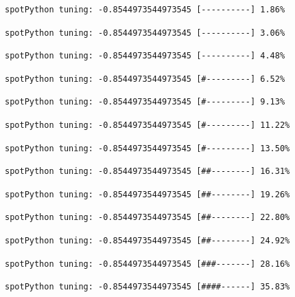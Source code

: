 \documentclass[
  letterpaper,
  DIV=11,
  numbers=noendperiod]{scrreprt}
\begin{document}
\begin{verbatim}
spotPython tuning: -0.8544973544973545 [----------] 1.86% 
\end{verbatim}

\begin{verbatim}
spotPython tuning: -0.8544973544973545 [----------] 3.06% 
\end{verbatim}

\begin{verbatim}
spotPython tuning: -0.8544973544973545 [----------] 4.48% 
\end{verbatim}

\begin{verbatim}
spotPython tuning: -0.8544973544973545 [#---------] 6.52% 
\end{verbatim}

\begin{verbatim}
spotPython tuning: -0.8544973544973545 [#---------] 9.13% 
\end{verbatim}

\begin{verbatim}
spotPython tuning: -0.8544973544973545 [#---------] 11.22% 
\end{verbatim}

\begin{verbatim}
spotPython tuning: -0.8544973544973545 [#---------] 13.50% 
\end{verbatim}

\begin{verbatim}
spotPython tuning: -0.8544973544973545 [##--------] 16.31% 
\end{verbatim}

\begin{verbatim}
spotPython tuning: -0.8544973544973545 [##--------] 19.26% 
\end{verbatim}

\begin{verbatim}
spotPython tuning: -0.8544973544973545 [##--------] 22.80% 
\end{verbatim}

\begin{verbatim}
spotPython tuning: -0.8544973544973545 [##--------] 24.92% 
\end{verbatim}

\begin{verbatim}
spotPython tuning: -0.8544973544973545 [###-------] 28.16% 
\end{verbatim}

\begin{verbatim}
spotPython tuning: -0.8544973544973545 [####------] 35.83% 
\end{verbatim}
\end{document}
